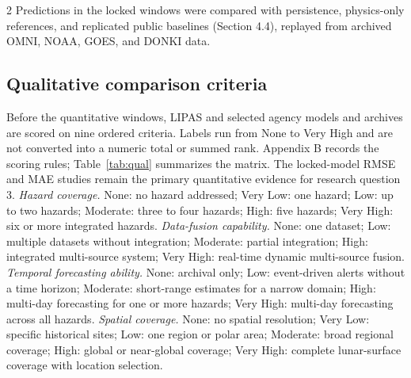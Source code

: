 \begin{multicols}{2}
Predictions in the locked windows were compared with persistence, physics-only references, and replicated public baselines (Section 4.4), replayed from archived OMNI, NOAA, GOES, and DONKI data.

\subsection{Qualitative comparison criteria}

Before the quantitative windows, LIPAS and selected agency models and archives are scored on nine ordered criteria. Labels run from None to Very High and are not converted into a numeric total or summed rank. Appendix B records the scoring rules; Table~\ref{tab:qual} summarizes the matrix. The locked-model RMSE and MAE studies remain the primary quantitative evidence for research question 3. 
\textit{Hazard coverage.} None: no hazard addressed; Very Low: one hazard; Low: up to two hazards; Moderate: three to four hazards; High: five hazards; Very High: six or more integrated hazards. 
\textit{Data-fusion capability.} None: one dataset; Low: multiple datasets without integration; Moderate: partial integration; High: integrated multi-source system; Very High: real-time dynamic multi-source fusion. 
\textit{Temporal forecasting ability.} None: archival only; Low: event-driven alerts without a time horizon; Moderate: short-range estimates for a narrow domain; High: multi-day forecasting for one or more hazards; Very High: multi-day forecasting across all hazards. 
\textit{Spatial coverage.} None: no spatial resolution; Very Low: specific historical sites; Low: one region or polar area; Moderate: broad regional coverage; High: global or near-global coverage; Very High: complete lunar-surface coverage with location selection.


\end{multicols}
